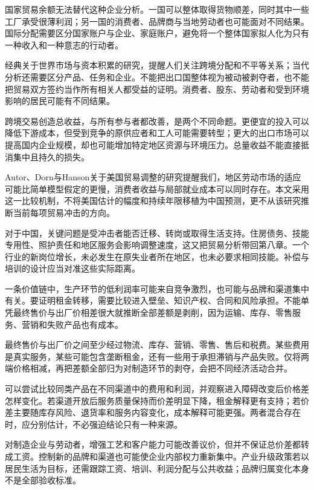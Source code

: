 \documentclass[UTF8,fontset=fandol,zihao=-4,oneside,openany]{ctexbook}
\begin{document}
国家贸易余额无法替代这种企业分析。一国可以整体取得货物顺差，同时其中一些工厂承受很薄利润；另一国的消费者、品牌商与当地劳动者也可能面对不同结果。国际分配需要区分国家账户与企业、家庭账户，避免将一个整体国家拟人化为只有一种收入和一种意志的行动者。

经典关于世界市场与资本积累的研究，提醒人们关注跨境分配和不平等关系；当代分析还需要区分产品、任务和企业。不能把出口国整体视为被动被剥夺者，也不能把贸易双方签约当作所有相关人都受益的证明。消费者、股东、劳动者和受到环境影响的居民可能有不同结果。

\label{arg:P209}
跨境交易创造总收益，与所有参与者都改善，是两个不同命题。更便宜的投入可以降低下游成本，但受到竞争的原供应者和工人可能需要转型；更大的出口市场可以提高国内企业规模，却也可能增加特定地区资源与环境压力。总量收益不能直接抵消集中且持久的损失。

Autor、Dorn与Hanson关于美国贸易调整的研究提醒我们，地区劳动市场的适应可能比简单模型假定的更慢，消费者收益与局部就业成本可以同时存在。本文采用这一比较机制，不将美国估计的幅度和持续年限移植为中国预测，更不从该研究推断当前每项贸易冲击的方向。\cite{TradeAdjust2016}

对于中国，关键问题是受冲击者能否迁移、转岗或取得生活支持。住房债务、技能专用性、照护责任和地区服务会影响调整速度，这又把贸易分析带回第八章。一个行业的新岗位增长，未必发生在原失业者所在地区，也未必要求相同技能。补偿与培训的设计应当对准这些实际距离。

一条价值链中，生产环节的低利润率可能来自竞争激烈，也可能与品牌和渠道集中有关。要证明租金转移，需要比较进入壁垒、知识产权、合同和风险承担。不能单凭最终售价与出厂价相差很大就推断全部差额是剥削，因为运输、库存、零售服务、营销和失败产品也有成本。

\label{arg:P210}
最终售价与出厂价之间至少经过物流、库存、营销、零售、售后和税费。某些费用是真实服务，某些可能包含垄断租金，还有一些用于承担滞销与产品失败。仅将两端价格相减，再把差额全部归为对制造环节的剥夺，会把不同经济活动合并。

可以尝试比较同类产品在不同渠道中的费用和利润，并观察进入障碍改变后价格差怎样变化。若渠道开放后服务质量保持而价差明显下降，租金解释更有支持；若价差主要随库存风险、退货率和服务内容变化，成本解释可能更强。两者混合存在时，应分别估计，不必强迫结论只有一种来源。

对制造企业与劳动者，增强工艺和客户能力可能改善议价，但并不保证总价差都转成工资。控制新的品牌和渠道也可能使企业内部权力重新集中。产业升级政策若以居民生活为目标，还需跟踪工资、培训、利润分配与公共收益；品牌归属变化本身不是全部验收标准。
\end{document}
